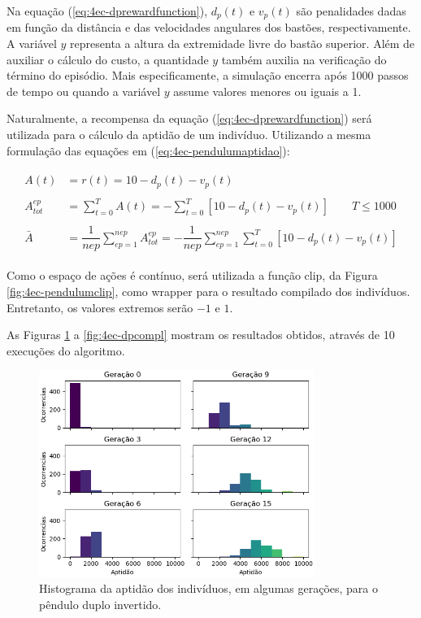 Na equação (\ref{eq:4ec-dprewardfunction}), $d_p(t)$ e $v_p(t)$ são penalidades dadas em função da distância e das velocidades angulares dos bastões, respectivamente. A variável $y$ representa a altura da extremidade livre do bastão superior. Além de auxiliar o cálculo do custo, a quantidade $y$ também auxilia na verificação do término do episódio. Mais especificamente, a simulação encerra após 1000 passos de tempo ou quando a variável $y$ assume valores menores ou iguais a 1.

Naturalmente, a recompensa da equação (\ref{eq:4ec-dprewardfunction}) será utilizada para o cálculo da aptidão de um indivíduo. Utilizando a mesma formulação das equações em (\ref{eq:4ec-pendulumaptidao}):

\begin{align}\label{eq:4ec-dpaptidao}
	\begin{split}
		A(t) &= r(t) = 10 - d_p(t) - v_p(t)\\\\
		A_{tot}^{ep} &= \sum_{t=0}^{T} A(t) = - \sum_{t=0}^{T} \left[
		10 - d_p(t) - v_p(t)
		\right]\qquad T \le 1000\\\\
		\bar{A} &= \dfrac{1}{nep}\sum_{ep=1}^{nep} A_{tot}^{ep} = 
		-\dfrac{1}{nep}\sum_{ep=1}^{nep}\sum_{t=0}^{T} 
		\left[
		10 - d_p(t) - v_p(t)
		\right]
	\end{split}
\end{align}

Como o espaço de ações é contínuo, será utilizada a função clip, da Figura \ref{fig:4ec-pendulumclip}, como wrapper para o resultado compilado dos indivíduos. Entretanto, os valores extremos serão $-1$ e $1$. 

As Figuras \ref{fig:4ec-dpapthist} a \ref{fig:4ec-dpcompl} mostram os resultados obtidos, através de 10 execuções do algoritmo.

\begin{figure}[H]
	\centering
	\includegraphics[width=0.8\textwidth]{02_desenvolvimento/04_EC_Fig_DPAptHist.png}
	\caption{Histograma da aptidão dos indivíduos, em algumas gerações, para o pêndulo duplo invertido.}
	\label{fig:4ec-dpapthist}
\end{figure}

